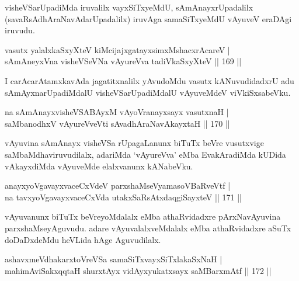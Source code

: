 \begin{artha}
visheVSarUpadiMda iruvalilx vayxSiTxyeMdU, sAmAnayxrUpadalilx (savaRsAdhAraNavAdarUpadalilx) iruvAga samaSiTxyeMdU vAyuveV eraDAgi iruvudu.
\end{artha}

\begin{shl}
vasutx yalalxkaSxyXteV kiMcijajxgatayxsimxMshacxrAcareV |\\
sAmAneyxVna visheVSeVNa vAyureVva tadiVkaSxyXteV \hfill || 169 ||
\end{shl}

\begin{artha}
I carAcarAtamxkavAda jagatitxnalilx yAvudoMdu vasutx kANuvudidadxrU adu sAmAyxnarUpadiMdalU visheVSarUpadiMdalU vAyuveMdeV viVkiSxsabeVku.
\end{artha}

\begin{shl}
na sAmAnayxvisheVSABAyxM vAyoVranayxsayx vasutxnaH |\\
saMbanodhxV vAyureVveVti sAvadhAraNavAkayxtaH \hfill || 170 ||
\end{shl}

\begin{artha}
vAyuvina sAmAnayx visheVSa rUpagaLanunx biTuTx beVre vusutxvige saMbaMdhaviruvudilalx, adariMda `vAyureVva' eMba EvakAradiMda kUDida vAkayxdiMda vAyuveMde elalxvanunx kANabeVku.
\end{artha}


\begin{shl}
anayxyoVgavayxvaceCxVdeV parxshaMseVyamasoVBaRveVtf |\\
na tavxyoVgavayxvaceCxVda utakxSaRsAtxdaqgiSayxteV \hfill || 171 ||
\end{shl}

\begin{artha}
vAyuvanunx biTuTx beVreyoMdalalx eMba athaRvidadxre pArxNavAyuvina parxshaMseyAguvudu. adare vAyuvalalxveMdalalx eMba athaRvidadxre aSuTx doDaDxdeMdu heVLida hAge Aguvudilalx.
\end{artha}


\begin{shl}
ashavxmeVdhakarxtoVreVSa samaSiTxvayxSiTxlakaSxNaH |\\
mahimA\s \s viSakxqqtaH shurxtAyx vidAyxyukatxsayx saMBarxmAtf \hfill || 172 ||
\end{shl}

